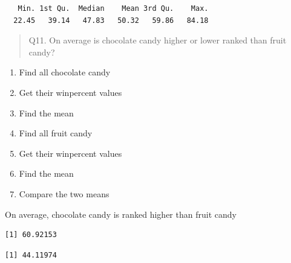 \documentclass[
  letterpaper,
  DIV=11,
  numbers=noendperiod]{scrartcl}
\newenvironment{Shaded}{\begin{snugshade}}{\end{snugshade}}
\newcommand{\DecValTok}[1]{\textcolor[rgb]{0.68,0.00,0.00}{#1}}
\newcommand{\FunctionTok}[1]{\textcolor[rgb]{0.28,0.35,0.67}{#1}}
\newcommand{\NormalTok}[1]{\textcolor[rgb]{0.00,0.23,0.31}{#1}}
\newcommand{\OtherTok}[1]{\textcolor[rgb]{0.00,0.23,0.31}{#1}}
\newcommand{\SpecialCharTok}[1]{\textcolor[rgb]{0.37,0.37,0.37}{#1}}
\providecommand{\tightlist}{%
  \setlength{\itemsep}{0pt}\setlength{\parskip}{0pt}}
\begin{document}
\begin{verbatim}
   Min. 1st Qu.  Median    Mean 3rd Qu.    Max. 
  22.45   39.14   47.83   50.32   59.86   84.18 
\end{verbatim}

\begin{quote}
Q11. On average is chocolate candy higher or lower ranked than fruit
candy?
\end{quote}

\begin{enumerate}
\def\labelenumi{\arabic{enumi}.}
\tightlist
\item
  Find all chocolate candy
\item
  Get their winpercent values
\item
  Find the mean
\item
  Find all fruit candy
\item
  Get their winpercent values
\item
  Find the mean
\item
  Compare the two means
\end{enumerate}

On average, chocolate candy is ranked higher than fruit candy

\begin{Shaded}
\end{Shaded}

\begin{verbatim}
[1] 60.92153
\end{verbatim}

\begin{Shaded}
\end{Shaded}

\begin{verbatim}
[1] 44.11974
\end{verbatim}
\end{document}
